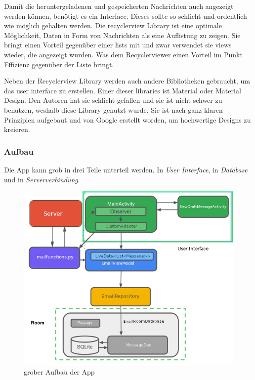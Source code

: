 \documentclass[a4paper,11pt]{article}
\begin{document}
\nohyphenation

Damit die heruntergeladenen und gespeicherten Nachrichten auch angezeigt werden können, benötigt es ein Interface. Dieses sollte so schlicht und ordentlich wie möglich gehalten werden. 
Die \gls{recyclerview} Library ist eine optimale Möglichkeit, Daten in Form von Nachrichten als eine Auflistung zu zeigen. Sie bringt einen Vorteil gegenüber einer \glspl{list} mit und zwar
verwendet sie \glspl{view} wieder, die angezeigt wurden. Was dem Recyclerviewer einen Vorteil im Punkt Effizienz gegenüber der Liste bringt. \cite{recyclerViewRecycle}

Neben der Recyclerview Library werden auch andere Bibliotheken gebraucht, um das \gls{user interface} zu erstellen. Einer dieser libraries ist Material oder Material Design. 
Den Autoren hat sie schlicht gefallen und sie ist nicht schwer zu benutzen, weshalb diese Library genutzt wurde. Sie ist nach ganz klaren Prinzipien aufgebaut 
und von Google erstellt worden, um hochwertige Designs zu kreieren. \cite{materialDesigne}

\endgroup

\subsubsection{Aufbau}

Die App kann grob in drei Teile unterteil werden. In \textit{User Interface}, in \textit{Database} und in \textit{Serververbindung}. 

\begingroup
\setlength{\intextsep}{7pt}
\setlength{\columnsep}{15pt}

\begin{figure}
\centering
    \includegraphics[scale=.52]{media/AppStructureFull.png}
\caption{grober Aufbau der App}
\end{figure}
\end{document}
